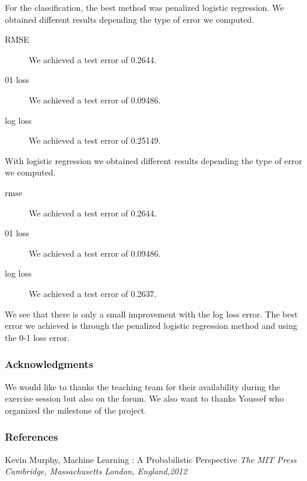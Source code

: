 \documentclass{article} %
\begin{document}
For the classification, the best method was penalized logistic regression. We obtained different results depending the type of error we computed. \begin{description}
\item[RMSE] We achieved a test error of 0.2644.
\item[01 loss]We achieved a test error of 0.09486.
\item[log loss] We achieved a test error of 0.25149.
\end{description}
With logistic regression we obtained different results depending the type of error we computed. \begin{description}
\item[rmse] We achieved a test error of 0.2644.
\item[01 loss]We achieved a test error of 0.09486.
\item[log loss] We achieved a test error of 0.2637.
\end{description}
We see that there is only a small improvement with the log loss error.
The best error we achieved is through the penalized logistic regression method and using the 0-1 loss error.

\subsubsection*{Acknowledgments}
We would like to thanks the teaching team for their availability during the exercise session but also on the forum. We also want to thanks Youssef who organized the milestone of the project.

\subsubsection*{References}
Kevin Murphy, Machine Learning : A Probabilistic Perspective {\em The MIT Press
Cambridge, Massachusetts
London, England,2012} 
\end{document}
